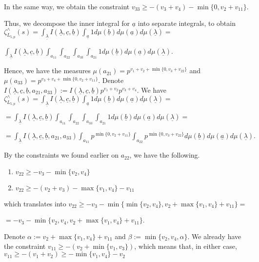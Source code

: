\documentclass{article}
\begin{document}
In the same way, we obtain the constraint $v_{33}\geq{-(v_{3}+v_{4})-\min\{0,v_{2}+v_{11}\}}$.

Thus, we decompose the inner integral for $\underline{a}$ into separate integrals, to obtain $\zeta_{L_{5,p}}^{\wedge}(s)=\displaystyle\int_{\underline\lambda}I(\underline{\lambda},\underline{c},\underline{b})\int_{\underline{a}}1d\mu(\underline{b})d\mu(\underline{a})d\mu(\underline{\lambda})=$

$\displaystyle\int_{\underline\lambda}I(\underline{\lambda},\underline{c},\underline{b})\int_{a_{11}}\int_{a_{22}}\int_{a_{33}}\int_{a_{21}}1d\mu(\underline{b})d\mu(\underline{a})d\mu(\underline{\lambda})$.

Hence, we have the measures $\mu(a_{21})=p^{v_{1}+v_{2}+\min\{0,v_{3}+v_{22}\}}$ and $\mu(a_{33})=p^{v_{3}+v_{4}+\min\{0,v_{2}+v_{11}\}}$.
Denote $I(\underline{\lambda},\underline{c},\underline{b},a_{21},a_{33}):=I(\underline{\lambda},\underline{c},\underline{b})p^{v_{1}+v_{2}}p^{v_{3}+v_{4}}$. We have $\zeta_{L_{5,p}}^{\wedge}(s)=\displaystyle\int_{\underline\lambda}I(\underline{\lambda},\underline{c},\underline{b})\int_{\underline{a}}1d\mu(\underline{b})d\mu(\underline{a})d\mu(\underline{\lambda})=$

$=\displaystyle\int_{\underline\lambda}I(\underline{\lambda},\underline{c},\underline{b})\int_{a_{11}}\int_{a_{22}}\int_{a_{33}}\int_{a_{21}}1d\mu(\underline{b})d\mu(\underline{a})d\mu(\underline{\lambda})=$

$=\displaystyle\int_{\underline\lambda}I(\underline{\lambda},\underline{c},\underline{b},a_{21},a_{33})\int_{a_{11}}p^{\min\{0,v_{2}+v_{11}\}}\int_{a_{22}}p^{\min\{0,v_{3}+v_{22}\}}d\mu(\underline{b})d\mu(\underline{a})d\mu(\underline{\lambda}).$

By the constraints we found earlier on $a_{22}$, we have the following.
\begin{enumerate}
    \item $v_{22}\geq{-v_{3}-\min\{v_{2},v_{4}\}}$
    \item $v_{22}\geq{-(v_{2}+v_{3})-\max\{v_{1},v_{4}\}-v_{11}}$
\end{enumerate}
which translates into $v_{22}\geq{-v_{3}-\min\{\min\{v_{2},v_{4}\},v_{2}+\max\{v_{1},v_{4}\}+v_{11}\}}=$

$=-v_{3}-\min\{v_{2},v_{4},v_{2}+\max\{v_{1},v_{4}\}+v_{11}\}$.

Denote $\alpha:=v_{2}+\max\{v_{1},v_{4}\}+v_{11}$ and $\beta:=\min\{v_{2},v_{4},\alpha\}$. We already have the constraint $v_{11}\geq{-(v_{2}+\min\{v_{1},v_{3}\})}$, which means that, in either case, $v_{11}\geq{-(v_{1}+v_{2})}\geq{-\min\{v_{1},v_{4}\}-v_{2}}$
\end{document}
